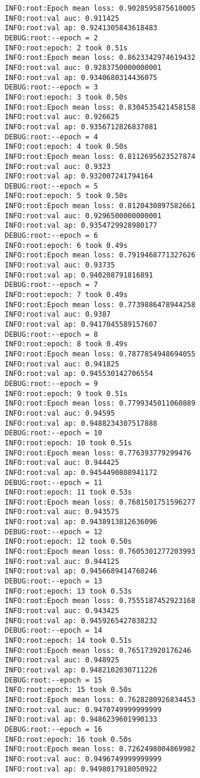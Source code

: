 \documentclass[11pt]{article}
\begin{document}
\begin{verbatim}
INFO:root:Epoch mean loss: 0.9028595875610005
INFO:root:val auc: 0.911425
INFO:root:val ap: 0.9241305843618483
DEBUG:root:--epoch = 2
INFO:root:epoch: 2 took 0.51s
INFO:root:Epoch mean loss: 0.8623342974619432
INFO:root:val auc: 0.9283750000000001
INFO:root:val ap: 0.9340680314436075
DEBUG:root:--epoch = 3
INFO:root:epoch: 3 took 0.50s
INFO:root:Epoch mean loss: 0.8304535421458158
INFO:root:val auc: 0.926625
INFO:root:val ap: 0.9356712826837081
DEBUG:root:--epoch = 4
INFO:root:epoch: 4 took 0.50s
INFO:root:Epoch mean loss: 0.8112695623527874
INFO:root:val auc: 0.9323
INFO:root:val ap: 0.932007241794164
DEBUG:root:--epoch = 5
INFO:root:epoch: 5 took 0.50s
INFO:root:Epoch mean loss: 0.8120430897582661
INFO:root:val auc: 0.9296500000000001
INFO:root:val ap: 0.9354729928980177
DEBUG:root:--epoch = 6
INFO:root:epoch: 6 took 0.49s
INFO:root:Epoch mean loss: 0.7919468771327626
INFO:root:val auc: 0.93735
INFO:root:val ap: 0.940208791816891
DEBUG:root:--epoch = 7
INFO:root:epoch: 7 took 0.49s
INFO:root:Epoch mean loss: 0.7739886478944258
INFO:root:val auc: 0.9387
INFO:root:val ap: 0.9417045589157607
DEBUG:root:--epoch = 8
INFO:root:epoch: 8 took 0.49s
INFO:root:Epoch mean loss: 0.7877854948694055
INFO:root:val auc: 0.941825
INFO:root:val ap: 0.945530142706554
DEBUG:root:--epoch = 9
INFO:root:epoch: 9 took 0.51s
INFO:root:Epoch mean loss: 0.7799345011060889
INFO:root:val auc: 0.94595
INFO:root:val ap: 0.9488234307517888
DEBUG:root:--epoch = 10
INFO:root:epoch: 10 took 0.51s
INFO:root:Epoch mean loss: 0.776393779299476
INFO:root:val auc: 0.944425
INFO:root:val ap: 0.9454490808941172
DEBUG:root:--epoch = 11
INFO:root:epoch: 11 took 0.53s
INFO:root:Epoch mean loss: 0.7681501751596277
INFO:root:val auc: 0.943575
INFO:root:val ap: 0.9438913812636096
DEBUG:root:--epoch = 12
INFO:root:epoch: 12 took 0.50s
INFO:root:Epoch mean loss: 0.7605301277203993
INFO:root:val auc: 0.944125
INFO:root:val ap: 0.9456689414760246
DEBUG:root:--epoch = 13
INFO:root:epoch: 13 took 0.53s
INFO:root:Epoch mean loss: 0.7555187452923168
INFO:root:val auc: 0.943425
INFO:root:val ap: 0.9459265427838232
DEBUG:root:--epoch = 14
INFO:root:epoch: 14 took 0.51s
INFO:root:Epoch mean loss: 0.765173920176246
INFO:root:val auc: 0.948925
INFO:root:val ap: 0.9482102030711226
DEBUG:root:--epoch = 15
INFO:root:epoch: 15 took 0.50s
INFO:root:Epoch mean loss: 0.7628280926834453
INFO:root:val auc: 0.9470749999999999
INFO:root:val ap: 0.9486239601990133
DEBUG:root:--epoch = 16
INFO:root:epoch: 16 took 0.50s
INFO:root:Epoch mean loss: 0.7262498004869982
INFO:root:val auc: 0.9496749999999999
INFO:root:val ap: 0.9498017918050922

\end{verbatim}
\end{document}
